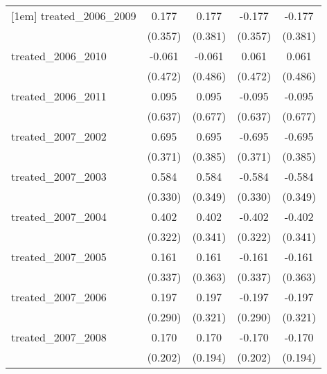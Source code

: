 {\begin{tabular}{l*{4}{c}}
[1em]
treated\_2006\_2009&       0.177         &       0.177         &      -0.177         &      -0.177         \\
            &     (0.357)         &     (0.381)         &     (0.357)         &     (0.381)         \\
[1em]
treated\_2006\_2010&      -0.061         &      -0.061         &       0.061         &       0.061         \\
            &     (0.472)         &     (0.486)         &     (0.472)         &     (0.486)         \\
[1em]
treated\_2006\_2011&       0.095         &       0.095         &      -0.095         &      -0.095         \\
            &     (0.637)         &     (0.677)         &     (0.637)         &     (0.677)         \\
[1em]
treated\_2007\_2002&       0.695         &       0.695         &      -0.695         &      -0.695         \\
            &     (0.371)         &     (0.385)         &     (0.371)         &     (0.385)         \\
[1em]
treated\_2007\_2003&       0.584         &       0.584         &      -0.584         &      -0.584         \\
            &     (0.330)         &     (0.349)         &     (0.330)         &     (0.349)         \\
[1em]
treated\_2007\_2004&       0.402         &       0.402         &      -0.402         &      -0.402         \\
            &     (0.322)         &     (0.341)         &     (0.322)         &     (0.341)         \\
[1em]
treated\_2007\_2005&       0.161         &       0.161         &      -0.161         &      -0.161         \\
            &     (0.337)         &     (0.363)         &     (0.337)         &     (0.363)         \\
[1em]
treated\_2007\_2006&       0.197         &       0.197         &      -0.197         &      -0.197         \\
            &     (0.290)         &     (0.321)         &     (0.290)         &     (0.321)         \\
[1em]
treated\_2007\_2008&       0.170         &       0.170         &      -0.170         &      -0.170         \\
            &     (0.202)         &     (0.194)         &     (0.202)         &     (0.194)         \\

\end{tabular}}
